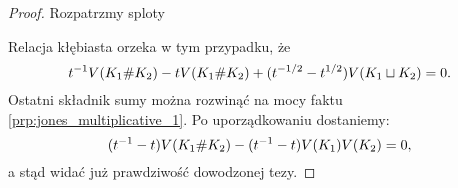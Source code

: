 \begin{proof}
    Rozpatrzmy sploty
\begin{comment}
    \[
        \begin{tikzpicture}[baseline=-0.65ex,scale=0.07]
        \begin{knot}[clip width=5, flip crossing/.list={1}]
            \strand[semithick] (-22, -5) rectangle (-12, 5);
            \strand[semithick] (22, -5) rectangle (12, 5);

            \strand[semithick,Latex-] (-12, 3) [in=left, out=right] to (12, -3);
            \strand[semithick,Latex-] (12, 3) [in=right, out=left] to (-12, -3);

            \node at (-17, 0) {$K_1$};
            \node at (17, 0) {$K_2$};
        \end{knot}
        \end{tikzpicture}
        \quad\quad
        \begin{tikzpicture}[baseline=-0.65ex,scale=0.07]
        \begin{knot}[clip width=5]
            \strand[semithick] (-22, -5) rectangle (-12, 5);
            \strand[semithick] (22, -5) rectangle (12, 5);

            \strand[semithick,Latex-] (-12, 3) [in=left, out=right] to (12, -3);
            \strand[semithick,Latex-] (12, 3) [in=right, out=left] to (-12, -3);

            \node at (-17, 0) {$K_1$};
            \node at (17, 0) {$K_2$};
        \end{knot}
        \end{tikzpicture}
        \quad\quad
        \begin{tikzpicture}[baseline=-0.65ex,scale=0.07]
        \begin{knot}[clip width=5]
            \strand[semithick] (-22, -5) rectangle (-12, 5);
            \strand[semithick] (-12, -3) [in=down, out=right] to (-2, 0);
            \strand[semithick,Latex-] (-12, 3) [in=up, out=right] to (-2, 0);

            \strand[semithick] (22, -5) rectangle (12, 5);
            \strand[semithick] (12, -3) [in=down, out=left] to (2, 0);
            \strand[semithick,Latex-] (12, 3) [in=up, out=left] to (2, 0);

            \node at (-17, 0) {$K_1$};
            \node at (17, 0) {$K_2$};
        \end{knot}
        \end{tikzpicture}
    \]
\end{comment}
    Relacja kłębiasta orzeka w tym przypadku, że
    \begin{equation}
        t^{-1} V(K_1 \# K_2) - t V(K_1 \# K_2) + (t^{-1/2} - t^{1/2}) V(K_1 \sqcup K_2) = 0.
    \end{equation}
    Ostatni składnik sumy można rozwinąć na mocy faktu \ref{prp:jones_multiplicative_1}.
    Po uporządkowaniu dostaniemy:
    \begin{equation}
        (t^{-1} - t) V(K_1 \# K_2) - (t^{-1} - t) V(K_1) V(K_2) = 0,
    \end{equation}
    a stąd widać już prawdziwość dowodzonej tezy.
\end{proof}

